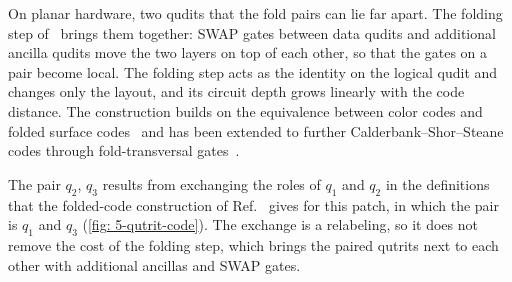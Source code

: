 On planar hardware, two qudits that the fold pairs can lie far apart. The folding step of~\cite{Moussa2016} brings them together: SWAP gates between data qudits and additional ancilla qudits move the two layers on top of each other, so that the gates on a pair become local. The folding step acts as the identity on the logical qudit and changes only the layout, and its circuit depth grows linearly with the code distance. The construction builds on the equivalence between color codes and folded surface codes~\cite{Kubica2015} and has been extended to further Calderbank--Shor--Steane codes through fold-transversal gates~\cite{BreuckmannBurton2024}.

The pair $q_2$, $q_3$ results from exchanging the roles of $q_1$ and $q_2$ in the definitions that the folded-code construction of Ref.~\cite{Moussa2016} gives for this patch, in which the pair is $q_1$ and $q_3$ (\autoref{fig: 5-qutrit-code}). The exchange is a relabeling, so it does not remove the cost of the folding step, which brings the paired qutrits next to each other with additional ancillas and SWAP gates.
